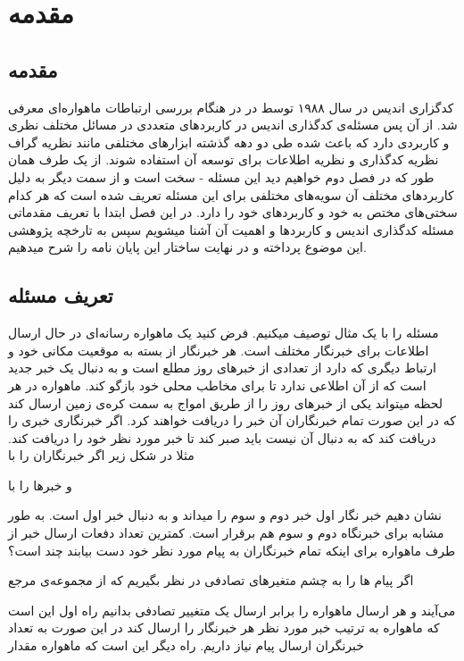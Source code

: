 \chapter{مقدمه}
\label{chapter:introduction}
\section{مقدمه}

کدگزاری اندیس در سال ۱۹۸۸ توسط در
\cite{ISCOD}
در هنگام بررسی ارتباطات ماهواره‌ای معرفی شد. از آن پس مسئله‌ی کدگذاری اندیس در کاربردهای متعددی در مسائل مختلف نظری و کاربردی دارد که باعث شده طی دو دهه گذشته ابزارهای مختلفی مانند نظریه گراف نظریه کدگذاری و نظریه اطلاعات برای توسعه آن استفاده شوند.
از یک طرف همان طور که در فصل دوم خواهیم دید این مسئله
-
سخت است و از سمت دیگر به دلیل کاربردهای مختلف آن سویه‌های مختلفی برای این مسئله تعریف شده است که هر کدام سختی‌های مختص به خود و کاربردهای خود را دارد.
در این فصل ابتدا با تعریف مقدماتی مسئله کدگذاری اندیس و کاربردها و اهمیت آن آشنا میشویم سپس به تارخچه پژوهشی این موضوع پرداخته و در نهایت ساختار این پایان نامه را شرح میدهیم.

\section{تعریف مسئله}
مسئله را با یک مثال توصیف میکنیم. فرض کنید یک ماهواره‌ رسانه‌ای در حال ارسال اطلاعات برای خبرنگار مختلف است. هر خبرنگار از بسته به موقعیت مکانی خود و ارتباط دیگری که دارد از تعدادی از خبرهای روز مطلع است و به دنبال یک خبر جدید است که از آن اطلاعی ندارد تا برای مخاطب محلی خود بازگو کند. ماهواره در هر لحظه میتواند یکی از خبرهای روز را از طریق امواج به سمت کره‌ی زمین ارسال کند که در این صورت تمام خبرنگاران آن خبر را دریافت خواهند کرد. اگر خبرنگاری خبری را دریافت کند که به دنبال آن نیست باید صبر کند تا خبر مورد نظر خود را دریافت کند. مثلا در شکل زیر اگر خبرنگاران را با

و خبرها را با

نشان دهیم خبر نگار اول خبر دوم و سوم را میداند و به دنبال خبر اول است. به طور مشابه برای خبرنگاه دوم و سوم هم برقرار است.
کمترین تعداد دفعات ارسال خبر از طرف ماهواره برای اینکه تمام خبرنگاران به پیام مورد نظر خود دست بیابند چند است؟

اگر پیام ها را به چشم متغیرهای تصادفی در نظر بگیریم که از مجموعه‌ی مرجع

می‌آیند و هر ارسال ماهواره را برابر ارسال یک متغییر تصادفی بدانیم راه اول این است که ماهواره به ترتیب خبر مورد نظر هر خبرنگار را ارسال کند در این صورت به تعداد خبرنگران ارسال پیام نیاز داریم.
راه دیگر این است که ماهواره مقدار

